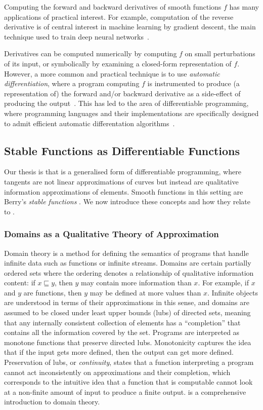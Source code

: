 
Computing the forward and backward derivatives of smooth functions $f$ has many applications of practical interest. For example, computation of the reverse derivative is of central interest in machine learning by gradient descent, the main technique used to train deep neural networks~\cite{rumelhart88,goodfellow16}.

Derivatives can be computed numerically by computing $f$ on small perturbations of its input, or symbolically by examining a closed-form representation of $f$. However, a more common and practical technique is to use \emph{automatic differentiation}, where a program computing $f$ is instrumented to produce (a representation of) the forward and/or backward derivative as a side-effect of producing the output~\cite{linnainmaa76}. This has led to the area of differentiable programming, where programming languages and their implementations are specifically designed to admit efficient automatic differentation algorithms~\cite{jax2018github,abadi16,elliott17,sigal24}.

\subsection{Stable Functions as Differentiable Functions}

Our thesis is that \GPS is a generalised form of differentiable programming, where tangents are not linear approximations of curves but instead are qualitative information approximations of elements. Smooth functions in this setting are Berry's \emph{stable functions} \cite{berry79,berry82}. We now introduce these concepts and how they relate to \GPS.

\subsubsection{Domains as a Qualitative Theory of Approximation}

Domain theory is a method for defining the semantics of programs that
handle infinite data such as functions or infinite streams. Domains
are certain partially ordered sets where the ordering denotes a
relationship of qualitative information content: if $x \sqsubseteq y$,
then $y$ may contain more information than $x$. For example, if $x$
and $y$ are functions, then $y$ may be defined at more values than
$x$. Infinite objects are understood in terms of their approximations
in this sense, and domains are assumed to be closed under least upper
bounds (lubs) of directed sets, meaning that any internally consistent
collection of elements has a ``completion'' that contains all the
information covered by the set. Programs are interpreted as monotone
functions that preserve directed lubs. Monotonicity captures the idea
that if the input gets more defined, then the output can get more
defined. Preservation of lubs, or \emph{continuity}, states that a
function interpreting a program cannot act inconsistently on
approximations and their completion, which corresponds to the
intuitive idea that a function that is computable cannot look at a
non-finite amount of input to produce a finite output. \cite{abramsky-jung} is a comprehensive introduction to domain theory.

